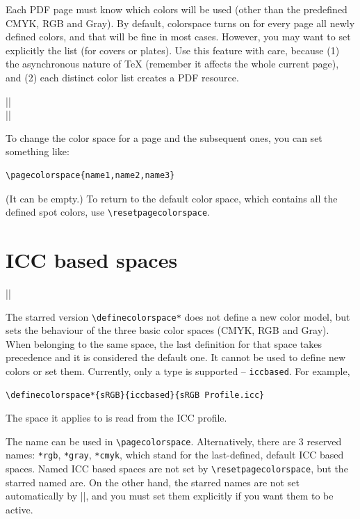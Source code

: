 \documentclass[a4paper]{ltxguide}
\begin{document}
Each PDF page must know which colors will be used (other than the
predefined CMYK, RGB and Gray). By default, \textsf{colorspace} turns
on for every page all newly defined colors, and that will be fine in
most cases. However, you may want to set explicitly the list (for
covers or plates). Use this feature with care, because (1) the
asynchronous nature of \TeX{} (remember it affects the whole current
page), and (2) each distinct color list creates a PDF resource.

\begin{decl}
||\\
|\resetpagecolorspace|
\end{decl}

To change the color space for a page and the subsequent ones, you can
set something like:
\begin{verbatim}
\pagecolorspace{name1,name2,name3}
\end{verbatim}
(It can be empty.) To return to the default color space, which
contains all the defined spot colors, use \verb|\resetpagecolorspace|.

\section{ICC based spaces}

\begin{decl}
  ||
\end{decl}
The starred version \verb|\definecolorspace*| does not define a new
color model, but sets the behaviour of the three basic color spaces
(CMYK, RGB and Gray).  When belonging to the same space, the last
definition for that space takes precedence and it is considered the
default one. It cannot be used to define new colors or set
them. Currently, only a type is supported -- \verb|iccbased|.  For
example,
\begin{verbatim}
\definecolorspace*{sRGB}{iccbased}{sRGB Profile.icc}
\end{verbatim}

The space it applies to is read from the ICC profile.

The name can be used in \verb|\pagecolorspace|. Alternatively, there
are 3 reserved names: \verb|*rgb|, \verb|*gray|, \verb|*cmyk|, which
stand for the last-defined, default ICC based spaces. Named ICC based
spaces are not set by \verb|\resetpagecolorspace|, but the starred
named are. On the other hand, the starred names are not set
automatically by ||, and you must set them explicitly
if you want them to be active.
\end{document}
